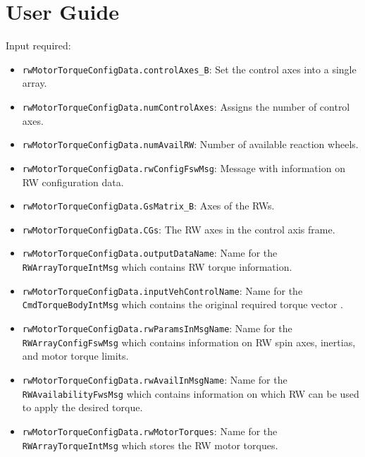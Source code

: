 
\section{User Guide}
Input required: 
\begin{itemize}

\item \verb~rwMotorTorqueConfigData.controlAxes_B~: Set the control axes into a single array.
\item  \verb~rwMotorTorqueConfigData.numControlAxes~: Assigns the number of control axes.
\item \verb~rwMotorTorqueConfigData.numAvailRW~: Number of available reaction wheels.
\item  \verb~rwMotorTorqueConfigData.rwConfigFswMsg~: Message with information on RW configuration data.
\item  \verb~rwMotorTorqueConfigData.GsMatrix_B~: Axes of the RWs.
\item  \verb~rwMotorTorqueConfigData.CGs~: The RW axes in the control axis frame.
\item  \verb~rwMotorTorqueConfigData.outputDataName~: Name for the \verb~RWArrayTorqueIntMsg~ which contains RW torque information.
\item  \verb~rwMotorTorqueConfigData.inputVehControlName~: Name for the \verb~CmdTorqueBodyIntMsg~ which contains the original required torque vector .
\item  \verb~rwMotorTorqueConfigData.rwParamsInMsgName~: Name for the \verb~RWArrayConfigFswMsg~ which contains information on RW spin axes, inertias, and motor torque limits.
\item  \verb~rwMotorTorqueConfigData.rwAvailInMsgName~: Name for the \verb~RWAvailabilityFwsMsg~ which contains information on which RW can be used to apply the desired torque. 
\item  \verb~rwMotorTorqueConfigData.rwMotorTorques~: Name for the \verb~RWArrayTorqueIntMsg~ which stores the RW motor torques. 


\end{itemize}
